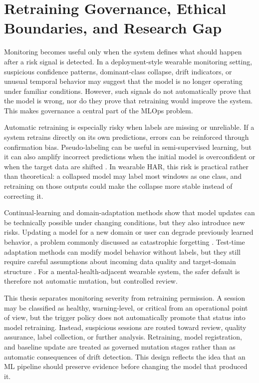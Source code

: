 \section{Retraining Governance, Ethical Boundaries, and Research Gap}

Monitoring becomes useful only when the system defines what should happen after a risk signal is detected. In a deployment-style wearable monitoring setting, suspicious confidence patterns, dominant-class collapse, drift indicators, or unusual temporal behavior may suggest that the model is no longer operating under familiar conditions. However, such signals do not automatically prove that the model is wrong, nor do they prove that retraining would improve the system. This makes governance a central part of the MLOps problem.

Automatic retraining is especially risky when labels are missing or unreliable. If a system retrains directly on its own predictions, errors can be reinforced through confirmation bias. Pseudo-labeling can be useful in semi-supervised learning, but it can also amplify incorrect predictions when the initial model is overconfident or when the target data are shifted \cite{lee2013pseudolabel,arazo2020pseudolabel}. In wearable HAR, this risk is practical rather than theoretical: a collapsed model may label most windows as one class, and retraining on those outputs could make the collapse more stable instead of correcting it.

Continual-learning and domain-adaptation methods show that model updates can be technically possible under changing conditions, but they also introduce new risks. Updating a model for a new domain or user can degrade previously learned behavior, a problem commonly discussed as catastrophic forgetting \cite{kirkpatrick2017ewc,jha2021continual}. Test-time adaptation methods can modify model behavior without labels, but they still require careful assumptions about incoming data quality and target-domain structure \cite{wang2021tent}. For a mental-health-adjacent wearable system, the safer default is therefore not automatic mutation, but controlled review.

This thesis separates monitoring severity from retraining permission. A session may be classified as healthy, warning-level, or critical from an operational point of view, but the trigger policy does not automatically promote that status into model retraining. Instead, suspicious sessions are routed toward review, quality assurance, label collection, or further analysis. Retraining, model registration, and baseline update are treated as governed mutation stages rather than as automatic consequences of drift detection. This design reflects the idea that an ML pipeline should preserve evidence before changing the model that produced it.

